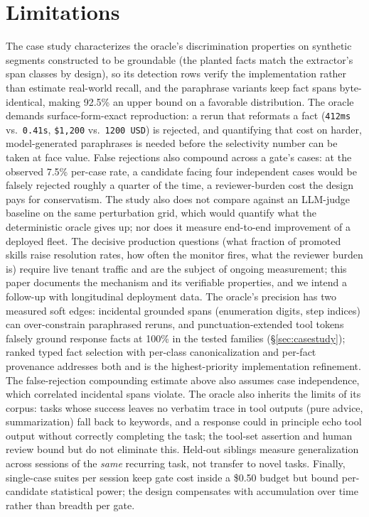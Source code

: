 \documentclass{article}
\newcommand{\code}[1]{\texttt{\small #1}}
\begin{document}
\section{Limitations}
\label{sec:limitations}

The case study characterizes the oracle's discrimination properties on synthetic segments constructed to be groundable (the planted facts match the extractor's span classes by design), so its detection rows verify the implementation rather than estimate real-world recall, and the paraphrase variants keep fact spans byte-identical, making 92.5\% an upper bound on a favorable distribution. The oracle demands surface-form-exact reproduction: a rerun that reformats a fact (\code{412ms} vs.\ \code{0.41s}, \code{\$1,200} vs.\ \code{1200 USD}) is rejected, and quantifying that cost on harder, model-generated paraphrases is needed before the selectivity number can be taken at face value. False rejections also compound across a gate's cases: at the observed 7.5\% per-case rate, a candidate facing four independent cases would be falsely rejected roughly a quarter of the time, a reviewer-burden cost the design pays for conservatism. The study also does not compare against an LLM-judge baseline on the same perturbation grid, which would quantify what the deterministic oracle gives up; nor does it measure end-to-end improvement of a deployed fleet. The decisive production questions (what fraction of promoted skills raise resolution rates, how often the monitor fires, what the reviewer burden is) require live tenant traffic and are the subject of ongoing measurement; this paper documents the mechanism and its verifiable properties, and we intend a follow-up with longitudinal deployment data. The oracle's precision has two measured soft edges: incidental grounded spans (enumeration digits, step indices) can over-constrain paraphrased reruns, and punctuation-extended tool tokens falsely ground response facts at 100\% in the tested families (\S\ref{sec:casestudy}); ranked typed fact selection with per-class canonicalization and per-fact provenance addresses both and is the highest-priority implementation refinement. The false-rejection compounding estimate above also assumes case independence, which correlated incidental spans violate. The oracle also inherits the limits of its corpus: tasks whose success leaves no verbatim trace in tool outputs (pure advice, summarization) fall back to keywords, and a response could in principle echo tool output without correctly completing the task; the tool-set assertion and human review bound but do not eliminate this. Held-out siblings measure generalization across sessions of the \emph{same} recurring task, not transfer to novel tasks. Finally, single-case suites per session keep gate cost inside a \$0.50 budget but bound per-candidate statistical power; the design compensates with accumulation over time rather than breadth per gate.
\end{document}
